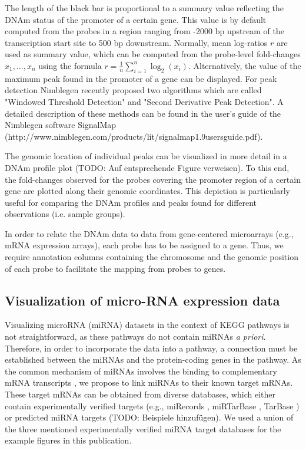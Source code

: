\documentclass{bioinfo}
\begin{document}
The length of the black bar is proportional to a summary value reflecting the DNAm status of the
promoter of a certain gene.  This value is by default computed from the probes in a region ranging
from -2000 bp upstream of the transcription start site to 500 bp downstream. Normally, mean
log-ratios $r$ are used as summary value, which can be computed from the probe-level fold-changes
$x_1,...,x_n$ using the formula $r=\frac{1}{n}\sum\limits_{i=1}^n\log_2(x_i)$. Alternatively, the
value of the maximum peak found in the promoter of a gene can be displayed. For peak detection
Nimblegen recently proposed two algorithms which are called "Windowed Threshold Detection" and
"Second Derivative Peak Detection". A detailed description of these methods can be found in the
user's guide of the Nimblegen software SignalMap
(http://www.nimblegen.com/products/lit/signalmap1.9usersguide.pdf).

The genomic location of individual peaks can be visualized in more detail in a DNAm profile plot
(TODO: Auf entsprechende Figure verweisen).  To this end, the fold-changes observed for the probes
covering the promoter region of a certain gene are plotted along their genomic coordinates. This
depiction is particularly useful for comparing the DNAm profiles and peaks found for different
observations (i.e. sample groups).

In order to relate the DNAm data to data from gene-centered microarrays (e.g., mRNA expression
arrays), each probe has to be assigned to a gene. Thus, we require annotation columns containing the
chromosome and the genomic position of each probe to facilitate the mapping from probes to genes.


\subsection{Visualization of micro-RNA expression data}

Visualizing microRNA (miRNA) datasets in the context of KEGG pathways is not straightforward, as
these pathways do not contain miRNAs \emph{a priori}. Therefore, in order to incorporate the data into a
pathway, a connection must be established between the miRNAs and the protein-coding genes
in the pathway. As the common mechanism of miRNAs involves the binding to complementary mRNA
transcripts \citep{Bartel2004}, we propose to link miRNAs to their known target mRNAs. These target
mRNAs can be obtained from diverse databases, which either contain experimentally verified targets
(e.g., miRecords \citep[see][]{miRecords}, miRTarBase \citep[see][]{miRTarBase}, TarBase
\citep[see][]{TarBase}) or predicted miRNA targets \citep[reviewed in][]{Alexiou2009} (TODO: Beispiele hinzufügen).
We used a union of the three mentioned experimentally verified miRNA target databases for the example figures in this publication.
\end{document}
